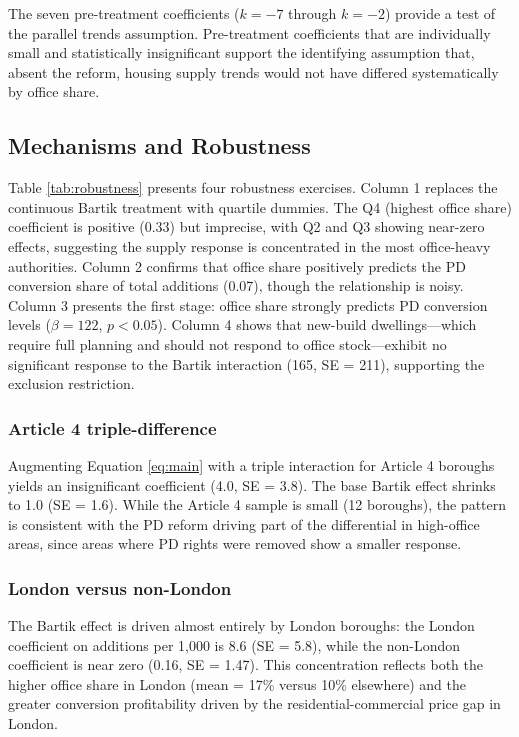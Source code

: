 \documentclass[12pt]{article}
\begin{document}


The seven pre-treatment coefficients ($k = -7$ through $k = -2$) provide a test of the parallel trends assumption. Pre-treatment coefficients that are individually small and statistically insignificant support the identifying assumption that, absent the reform, housing supply trends would not have differed systematically by office share.

\subsection{Mechanisms and Robustness}

Table \ref{tab:robustness} presents four robustness exercises. Column 1 replaces the continuous Bartik treatment with quartile dummies. The Q4 (highest office share) coefficient is positive (0.33) but imprecise, with Q2 and Q3 showing near-zero effects, suggesting the supply response is concentrated in the most office-heavy authorities. Column 2 confirms that office share positively predicts the PD conversion share of total additions (0.07), though the relationship is noisy. Column 3 presents the first stage: office share strongly predicts PD conversion levels ($\beta = 122$, $p < 0.05$). Column 4 shows that new-build dwellings---which require full planning and should not respond to office stock---exhibit no significant response to the Bartik interaction (165, SE = 211), supporting the exclusion restriction.

{\small}

\subsubsection*{Article 4 triple-difference} Augmenting Equation \ref{eq:main} with a triple interaction for Article 4 boroughs yields an insignificant coefficient (4.0, SE = 3.8). The base Bartik effect shrinks to 1.0 (SE = 1.6). While the Article 4 sample is small (12 boroughs), the pattern is consistent with the PD reform driving part of the differential in high-office areas, since areas where PD rights were removed show a smaller response.

\subsubsection*{London versus non-London} The Bartik effect is driven almost entirely by London boroughs: the London coefficient on additions per 1,000 is 8.6 (SE = 5.8), while the non-London coefficient is near zero (0.16, SE = 1.47). This concentration reflects both the higher office share in London (mean = 17\% versus 10\% elsewhere) and the greater conversion profitability driven by the residential-commercial price gap in London.
\end{document}
